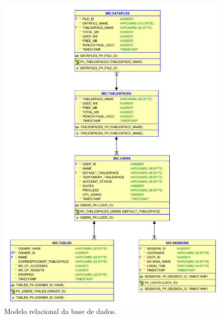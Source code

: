\begin{figure}[h!]
 \includegraphics[scale=0.5]{tex/img/modelo_concetual.pdf}
    \caption{Modelo relacional da base de dados.} 
    \label{fig:modelo}
\end{figure}


